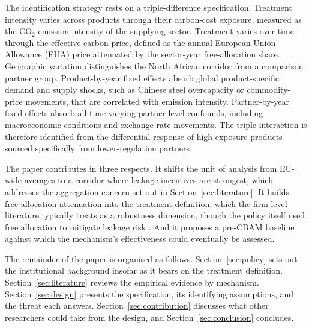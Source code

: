 The identification strategy rests on a triple-difference specification. Treatment intensity varies across products through their carbon-cost exposure, measured as the CO$_2$ emission intensity of the supplying sector. Treatment varies over time through the effective carbon price, defined as the annual European Union Allowance (EUA) price attenuated by the sector-year free-allocation share. Geographic variation distinguishes the North African corridor from a comparison partner group. Product-by-year fixed effects absorb global product-specific demand and supply shocks, such as Chinese steel overcapacity or commodity-price movements, that are correlated with emission intensity. Partner-by-year fixed effects absorb all time-varying partner-level confounds, including macroeconomic conditions and exchange-rate movements. The triple interaction is therefore identified from the differential response of high-exposure products sourced specifically from lower-regulation partners.

The paper contributes in three respects. It shifts the unit of analysis from EU-wide averages to a corridor where leakage incentives are strongest, which addresses the aggregation concern set out in Section~\ref{sec:literature}. It builds free-allocation attenuation into the treatment definition, which the firm-level literature typically treats as a robustness dimension, though the policy itself used free allocation to mitigate leakage risk \citep{martin2016}. And it proposes a pre-CBAM baseline against which the mechanism's effectiveness could eventually be assessed.

The remainder of the paper is organised as follows. Section~\ref{sec:policy} sets out the institutional background insofar as it bears on the treatment definition. Section~\ref{sec:literature} reviews the empirical evidence by mechanism. Section~\ref{sec:design} presents the specification, its identifying assumptions, and the threat each answers. Section~\ref{sec:contribution} discusses what other researchers could take from the design, and Section~\ref{sec:conclusion} concludes.
